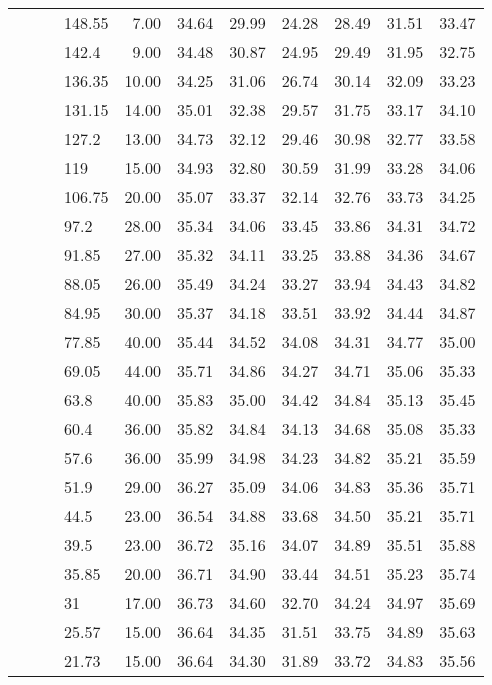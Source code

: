 \begin{longtable}{llllrrrrrrr}
   &  &  & 148.55 & 7.00 & 34.64 & 29.99 & 24.28 & 28.49 & 31.51 & 33.47 \\ 
   &  &  & 142.4 & 9.00 & 34.48 & 30.87 & 24.95 & 29.49 & 31.95 & 32.75 \\ 
   &  &  & 136.35 & 10.00 & 34.25 & 31.06 & 26.74 & 30.14 & 32.09 & 33.23 \\ 
   &  &  & 131.15 & 14.00 & 35.01 & 32.38 & 29.57 & 31.75 & 33.17 & 34.10 \\ 
   &  &  & 127.2 & 13.00 & 34.73 & 32.12 & 29.46 & 30.98 & 32.77 & 33.58 \\ 
   &  &  & 119 & 15.00 & 34.93 & 32.80 & 30.59 & 31.99 & 33.28 & 34.06 \\ 
   &  &  & 106.75 & 20.00 & 35.07 & 33.37 & 32.14 & 32.76 & 33.73 & 34.25 \\ 
   &  &  & 97.2 & 28.00 & 35.34 & 34.06 & 33.45 & 33.86 & 34.31 & 34.72 \\ 
   &  &  & 91.85 & 27.00 & 35.32 & 34.11 & 33.25 & 33.88 & 34.36 & 34.67 \\ 
   &  &  & 88.05 & 26.00 & 35.49 & 34.24 & 33.27 & 33.94 & 34.43 & 34.82 \\ 
   &  &  & 84.95 & 30.00 & 35.37 & 34.18 & 33.51 & 33.92 & 34.44 & 34.87 \\ 
   &  &  & 77.85 & 40.00 & 35.44 & 34.52 & 34.08 & 34.31 & 34.77 & 35.00 \\ 
   &  &  & 69.05 & 44.00 & 35.71 & 34.86 & 34.27 & 34.71 & 35.06 & 35.33 \\ 
   &  &  & 63.8 & 40.00 & 35.83 & 35.00 & 34.42 & 34.84 & 35.13 & 35.45 \\ 
   &  &  & 60.4 & 36.00 & 35.82 & 34.84 & 34.13 & 34.68 & 35.08 & 35.33 \\ 
   &  &  & 57.6 & 36.00 & 35.99 & 34.98 & 34.23 & 34.82 & 35.21 & 35.59 \\ 
   &  &  & 51.9 & 29.00 & 36.27 & 35.09 & 34.06 & 34.83 & 35.36 & 35.71 \\ 
   &  &  & 44.5 & 23.00 & 36.54 & 34.88 & 33.68 & 34.50 & 35.21 & 35.71 \\ 
   &  &  & 39.5 & 23.00 & 36.72 & 35.16 & 34.07 & 34.89 & 35.51 & 35.88 \\ 
   &  &  & 35.85 & 20.00 & 36.71 & 34.90 & 33.44 & 34.51 & 35.23 & 35.74 \\ 
   &  &  & 31 & 17.00 & 36.73 & 34.60 & 32.70 & 34.24 & 34.97 & 35.69 \\ 
   &  &  & 25.57 & 15.00 & 36.64 & 34.35 & 31.51 & 33.75 & 34.89 & 35.63 \\ 
   &  &  & 21.73 & 15.00 & 36.64 & 34.30 & 31.89 & 33.72 & 34.83 & 35.56 \\ 

\end{longtable}
